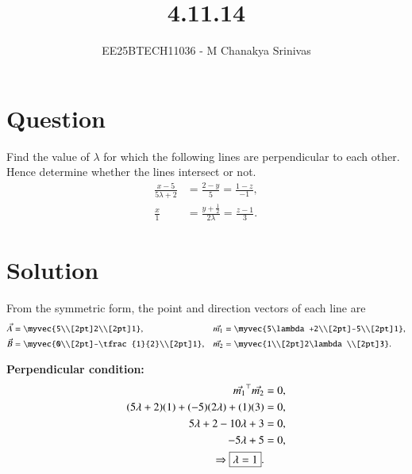 \documentclass[journal]{IEEEtran}
\begin{document}

\vspace{3cm}

\title{4.11.14}
\author{EE25BTECH11036 - M Chanakya Srinivas}
\maketitle

\renewcommand{\thetable}{\theenumi}
\setlength{\intextsep}{10pt}
\renewcommand\theequation{\arabic{equation}}

\section*{Question}
Find the value of \(\lambda\) for which the following lines are perpendicular to each other. Hence determine whether the lines intersect or not.
\begin{align}
\frac{x-5}{5\lambda+2} &= \frac{2-y}{5} = \frac{1-z}{-1}, \label{eq:l1}\\
\frac{x}{1} &= \frac{y+\tfrac{1}{2}}{2\lambda} = \frac{z-1}{3}. \label{eq:l2}
\end{align}


\section*{Solution}

From the symmetric form, the point and direction vectors of each line are
\begin{align}
\vec{A} &= \myvec{5\\[2pt]2\\[2pt]1}, &
\vec{m_1} &= \myvec{5\lambda+2\\[2pt]-5\\[2pt]1}, \label{eq:a_m1}\\
\vec{B} &= \myvec{0\\[2pt]-\tfrac{1}{2}\\[2pt]1}, &
\vec{m_2} &= \myvec{1\\[2pt]2\lambda\\[2pt]3}. \label{eq:b_m2}
\end{align}

\noindent\textbf{Perpendicular condition:}
\begin{align}
\vec{m_1}^\top \vec{m_2} &= 0, \notag\\
(5\lambda+2)(1) + (-5)(2\lambda) + (1)(3) &= 0, \notag\\
5\lambda + 2 - 10\lambda + 3 &= 0, \notag\\
-5\lambda + 5 &= 0, \notag\\
\Rightarrow \boxed{\lambda = 1}. \label{eq:lambda}
\end{align}
\end{document}

